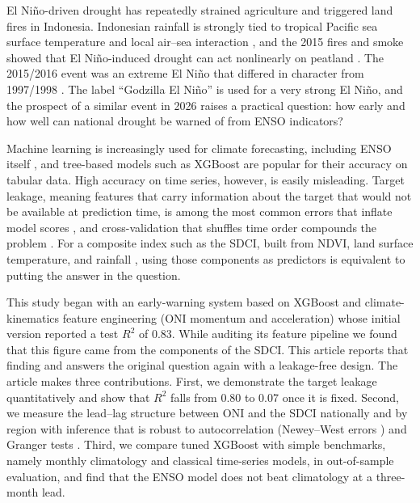 \documentclass[11pt,twoside]{article}
\begin{document}
El Ni\~no-driven drought has repeatedly strained agriculture and triggered land fires in Indonesia. Indonesian rainfall is strongly tied to tropical Pacific sea surface temperature and local air--sea interaction \cite{hendon2003indonesian,aldrian2003rainfall,hamada2002rainy}, and the 2015 fires and smoke showed that El Ni\~no-induced drought can act nonlinearly on peatland \cite{field2016fire}. The 2015/2016 event was an extreme El Ni\~no that differed in character from 1997/1998 \cite{paek2017different}. The label ``Godzilla El Ni\~no'' is used for a very strong El Ni\~no, and the prospect of a similar event in 2026 raises a practical question: how early and how well can national drought be warned of from ENSO indicators?

Machine learning is increasingly used for climate forecasting, including ENSO itself \cite{ham2019deep}, and tree-based models such as XGBoost \cite{chen2016xgboost} are popular for their accuracy on tabular data. High accuracy on time series, however, is easily misleading. Target leakage, meaning features that carry information about the target that would not be available at prediction time, is among the most common errors that inflate model scores \cite{kaufman2012leakage}, and cross-validation that shuffles time order compounds the problem \cite{bergmeir2012cv}. For a composite index such as the SDCI, built from NDVI, land surface temperature, and rainfall \cite{rhee2010sdci,kogan1995vci}, using those components as predictors is equivalent to putting the answer in the question.

This study began with an early-warning system based on XGBoost and climate-kinematics feature engineering (ONI momentum and acceleration) whose initial version reported a test $R^2$ of 0.83. While auditing its feature pipeline we found that this figure came from the components of the SDCI. This article reports that finding and answers the original question again with a leakage-free design. The article makes three contributions. First, we demonstrate the target leakage quantitatively and show that $R^2$ falls from 0.80 to 0.07 once it is fixed. Second, we measure the lead--lag structure between ONI and the SDCI nationally and by region with inference that is robust to autocorrelation (Newey--West errors \cite{newey1987hac}) and Granger tests \cite{granger1969causality}. Third, we compare tuned XGBoost with simple benchmarks, namely monthly climatology and classical time-series models, in out-of-sample evaluation, and find that the ENSO model does not beat climatology at a three-month lead.
\end{document}
